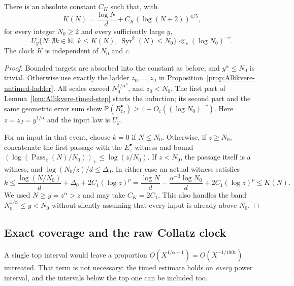 \begin{proposition}
\label{prop:Allikvere-timed-block}
There is an absolute constant $C_K$ such that, with
\[
 K(N)=\frac{\log N}{d}+C_K(\log(N+2))^{4/5},
\]
for every integer $N_0\ge2$ and every sufficiently large $y$,
\[
 U_y\{N:\nexists k\in\mathbb N,\ k\le K(N),\ \operatorname{Syr}^k(N)\le N_0\}
                   \ll_c(\log N_0)^{-c}.
\]
The clock $K$ is independent of $N_0$ and $c$.
\end{proposition}
\begin{proof}
Bounded targets are absorbed into the constant as before, and
$y^\alpha\le N_0$ is trivial. Otherwise use exactly the ladder
$z_0,\ldots,z_J$ in Proposition~\ref{prop:Allikvere-untimed-ladder}.
All scales exceed $N_0^{1/\alpha^3}$, and $z_0<N_0$.
The first part of Lemma~\ref{lem:Allikvere-timed-step} starts the induction;
its second part and the same geometric error sum show
$\mathbb P(B_{z_J}^\bullet)\ge1-O_c((\log N_0)^{-c})$.
Here $z=z_J=y^{1/\alpha}$ and the input law is $U_y$.

For an input in that event, choose $k=0$ if $N\le N_0$.
Otherwise, if $z\ge N_0$, concatenate the first passage with the
$E_z^\bullet$ witness and bound
$(\log(\operatorname{Pass}_z(N)/N_0))_+\le\log(z/N_0)$.
If $z<N_0$, the passage itself is a witness, and
$\log(N_0/z)/d\le\Delta_0$. In either case an actual witness satisfies
\[
 k\le\frac{\log(N/N_0)}d+\Delta_0+2C_1(\log z)^p
   =\frac{\log N}d-\frac{\alpha^{-3}\log N_0}d
                              +2C_1(\log z)^p
   \le K(N).
\]
We used $N\ge y=z^\alpha>z$ and may take $C_K=2C_1$.
This also handles the band $N_0^{1/\alpha}\le y<N_0$ without
silently assuming that every input is already above $N_0$.
\end{proof}

\subsection{Exact coverage and the raw Collatz clock}

A single top interval would leave a proportion
$O(X^{1/\alpha-1})=O(X^{-1/1001})$ untreated. That term is not
necessary: the timed estimate holds on \emph{every} power interval,
and the intervals below the top one can be included too.

